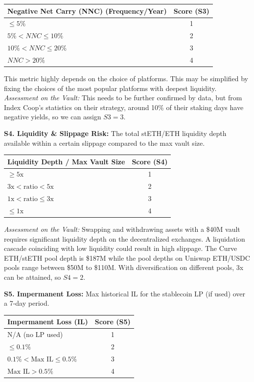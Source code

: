 \documentclass[11pt, a4paper]{article}
\begin{document}
\begin{tabularx}{0.6\textwidth}{@{} X c @{}}
\toprule
\textbf{Negative Net Carry (NNC) (Frequency/Year)} & \textbf{Score (S3)} \\
\midrule
$\le 5\%$ & 1 \\
$5\% < NNC \le 10\%$ & 2 \\
$10\% < NNC \le 20\%$ & 3 \\
$NNC > 20\%$ & 4 \\
\bottomrule
\end{tabularx}

This metric highly depends on the choice of platforms. This may be simplified by fixing the choices of the most popular platforms with deepest liquidity. \\
\textit{Assessment on the Vault:} This needs to be further confirmed by data, but from Index Coop's statistics on their strategy, around 10\% of their staking days have negative yields, so we can assign $S3 = 3$.

\textbf{S4. Liquidity \& Slippage Risk:} The total stETH/ETH liquidity depth available within a certain slippage compared to the max vault size.

\begin{tabularx}{0.6\textwidth}{@{} X c @{}}
\toprule
\textbf{Liquidity Depth / Max Vault Size} & \textbf{Score (S4)} \\
\midrule
$\ge 5\text{x}$ & 1 \\
$3\text{x} < \text{ratio} < 5\text{x}$ & 2 \\
$1\text{x} < \text{ratio} \le 3\text{x}$ & 3 \\
$\le 1\text{x}$ & 4 \\
\bottomrule
\end{tabularx}

\textit{Assessment on the Vault:} Swapping and withdrawing assets with a \$40M vault requires significant liquidity depth on the decentralized exchanges. A liquidation cascade coinciding with low liquidity could result in high slippage. The Curve ETH/stETH pool depth is \$187M while the pool depths on Uniswap ETH/USDC pools range between \$50M to \$110M. With diversification on different pools, 3x can be attained, so $S4 = 2$.

\textbf{S5. Impermanent Loss:} Max historical IL for the stablecoin LP (if used) over a 7-day period.

\begin{tabularx}{0.6\textwidth}{@{} X c @{}}
\toprule
\textbf{Impermanent Loss (IL)} & \textbf{Score (S5)} \\
\midrule
N/A (no LP used) & 1 \\
$\le 0.1\%$ & 2 \\
$0.1\% < \text{Max IL} \le 0.5\%$ & 3 \\
$\text{Max IL} > 0.5\%$ & 4 \\
\bottomrule
\end{tabularx}
\end{document}
